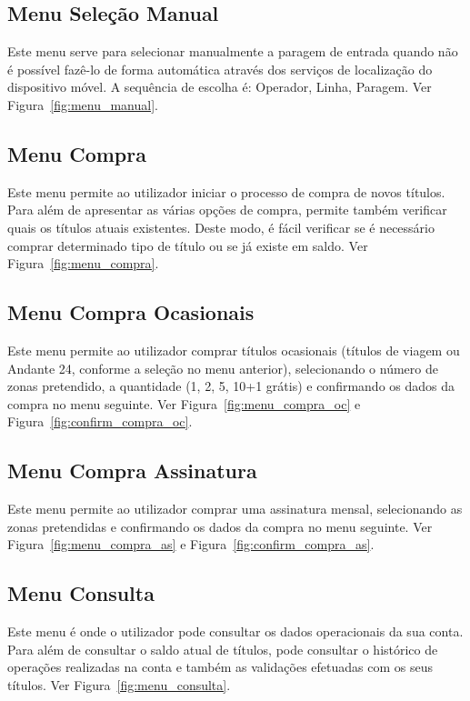 \subsection{Menu Seleção Manual}

Este menu serve para selecionar manualmente a paragem de entrada quando não é possível fazê-lo de forma automática através dos serviços de localização do dispositivo móvel. A sequência de escolha é: Operador, Linha, Paragem. Ver Figura~\ref{fig:menu_manual}.

\subsection{Menu Compra}

Este menu permite ao utilizador iniciar o processo de compra de novos títulos. Para além de apresentar as várias opções de compra, permite também verificar quais os títulos atuais existentes. Deste modo, é fácil verificar se é necessário comprar determinado tipo de título ou se já existe em saldo. Ver Figura~\ref{fig:menu_compra}.

\subsection{Menu Compra Ocasionais}

Este menu permite ao utilizador comprar títulos ocasionais (títulos de viagem ou Andante 24, conforme a seleção no menu anterior), selecionando o número de zonas pretendido, a quantidade (1, 2, 5, 10+1 grátis) e confirmando os dados da compra no menu seguinte. Ver Figura~\ref{fig:menu_compra_oc} e Figura~\ref{fig:confirm_compra_oc}.

\subsection{Menu Compra Assinatura}

Este menu permite ao utilizador comprar uma assinatura mensal, selecionando as zonas pretendidas e confirmando os dados da compra no menu seguinte. Ver Figura~\ref{fig:menu_compra_as} e Figura~\ref{fig:confirm_compra_as}.

\subsection{Menu Consulta}

Este menu é onde o utilizador pode consultar os dados operacionais da sua conta. Para além de consultar o saldo atual de títulos, pode consultar o histórico de operações realizadas na conta e também as validações efetuadas com os seus títulos. Ver Figura~\ref{fig:menu_consulta}.

